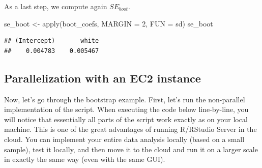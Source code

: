\documentclass[
  12pt,
]{style/krantz}
\newenvironment{Shaded}{\begin{snugshade}}{\end{snugshade}}
\newcommand{\AttributeTok}[1]{\textcolor[rgb]{0.77,0.63,0.00}{#1}}
\newcommand{\DecValTok}[1]{\textcolor[rgb]{0.00,0.00,0.81}{#1}}
\newcommand{\FunctionTok}[1]{\textcolor[rgb]{0.00,0.00,0.00}{#1}}
\newcommand{\NormalTok}[1]{#1}
\newcommand{\OtherTok}[1]{\textcolor[rgb]{0.56,0.35,0.01}{#1}}
\begin{document}
As a last step, we compute again \(SE_{boot}\).

\begin{Shaded}
\begin{Highlighting}[]
\NormalTok{se\_boot }\OtherTok{\textless{}{-}} \FunctionTok{apply}\NormalTok{(boot\_coefs, }
                 \AttributeTok{MARGIN =} \DecValTok{2}\NormalTok{,}
                 \AttributeTok{FUN =}\NormalTok{ sd)}
\NormalTok{se\_boot}
\end{Highlighting}
\end{Shaded}

\begin{verbatim}
## (Intercept)       white 
##    0.004783    0.005467
\end{verbatim}

\hypertarget{parallelization-with-an-ec2-instance-1}{%
\subsection{Parallelization with an EC2 instance}\label{parallelization-with-an-ec2-instance-1}}

Now, let's go through the bootstrap example. First, let's run the non-parallel implementation of the script. When executing the code below line-by-line, you will notice that essentially all parts of the script work exactly as on your local machine. This is one of the great advantages of running R/RStudio Server in the cloud. You can implement your entire data analysis locally (based on a small sample), test it locally, and then move it to the cloud and run it on a larger scale in exactly the same way (even with the same GUI).
\end{document}
